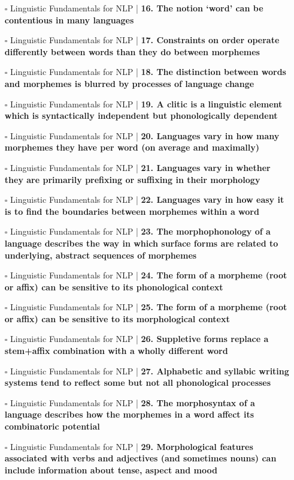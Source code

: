 \documentclass[a4, landscape, 12pt]{article}
\newcommand{\checkbox}{$\square$}%
\begin{document}
\begin{itemize}
{}
\item [\checkbox]  Linguistic Fundamentals for NLP | \textbf{ 16. The notion ‘word’ can be contentious in many languages
}
\item [\checkbox]  Linguistic Fundamentals for NLP | \textbf{ 17. Constraints on order operate differently between words than they do between morphemes
}
\item [\checkbox]  Linguistic Fundamentals for NLP | \textbf{ 18. The distinction between words and morphemes is blurred by processes of language change
}
\item [\checkbox]  Linguistic Fundamentals for NLP | \textbf{ 19. A clitic is a linguistic element which is syntactically independent but phonologically dependent
}
\item [\checkbox]  Linguistic Fundamentals for NLP | \textbf{ 20. Languages vary in how many morphemes they have per word (on average and maximally)
}
\item [\checkbox]  Linguistic Fundamentals for NLP | \textbf{ 21. Languages vary in whether they are primarily prefixing or suffixing in their morphology
}
\item [\checkbox]  Linguistic Fundamentals for NLP | \textbf{ 22. Languages vary in how easy it is to find the boundaries between morphemes within a word
}
\item [\checkbox]  Linguistic Fundamentals for NLP | \textbf{ 23. The morphophonology of a language describes the way in which surface forms are related to underlying, abstract sequences of morphemes
}
\item [\checkbox]  Linguistic Fundamentals for NLP | \textbf{ 24. The form of a morpheme (root or affix) can be sensitive to its phonological context
}
\item [\checkbox]  Linguistic Fundamentals for NLP | \textbf{ 25. The form of a morpheme (root or affix) can be sensitive to its morphological context
}
\item [\checkbox]  Linguistic Fundamentals for NLP | \textbf{ 26. Suppletive forms replace a stem+affix combination with a wholly different word
}
\item [\checkbox]  Linguistic Fundamentals for NLP | \textbf{ 27. Alphabetic and syllabic writing systems tend to reflect some but not all phonological processes
}
\item [\checkbox]  Linguistic Fundamentals for NLP | \textbf{ 28. The morphosyntax of a language describes how the morphemes in a word affect its combinatoric potential
}
\item [\checkbox]  Linguistic Fundamentals for NLP | \textbf{ 29. Morphological features associated with verbs and adjectives (and sometimes nouns) can include information about tense, aspect and mood
}
\end{itemize}
\end{document}
